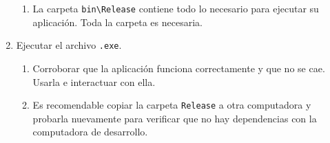 \documentclass[12pt,a4paper]{article}
\begin{document}
\begin{enumerate}
\begin{enumerate}
		\item La carpeta \texttt{bin{\textbackslash}Release} contiene todo lo necesario para ejecutar su aplicación. Toda la carpeta es necesaria.
	\end{enumerate}
	\item Ejecutar el archivo \texttt{.exe}.
	\begin{enumerate}
	\item Corroborar que la aplicación funciona correctamente y que no se cae. Usarla e interactuar con ella.
	\item Es recomendable copiar la carpeta \texttt{Release} a otra computadora y probarla nuevamente para verificar que no hay dependencias con la computadora de desarrollo.
	\end{enumerate}	
	 
\end{enumerate}
\clearpage
\end{document}
